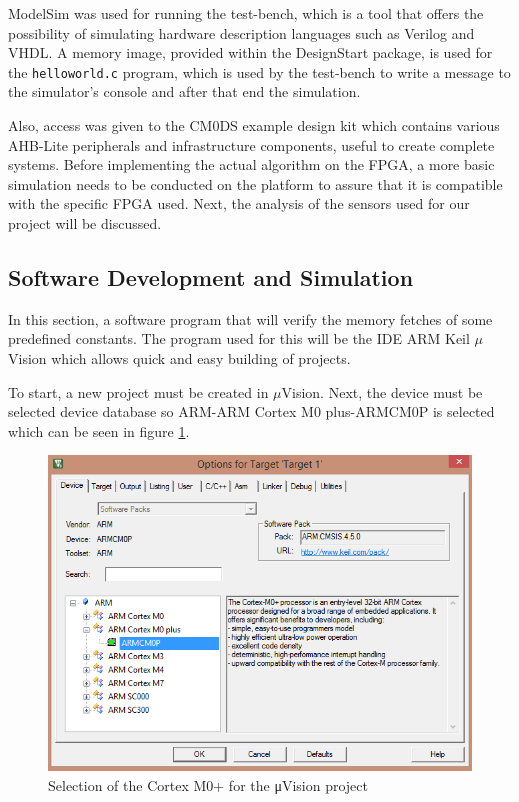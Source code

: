 ModelSim was used for running the test-bench, which is a tool that offers the possibility of simulating hardware description languages such as Verilog and VHDL.  A memory image, provided within the DesignStart package, is used for the \verb|helloworld.c| program, which is used by the test-bench to write a message to the simulator's console and after that end the simulation. 

Also, access was given to the CM0DS example design kit which contains various AHB-Lite peripherals and infrastructure components, useful to create complete systems. Before implementing the actual algorithm on the FPGA, a more basic simulation needs to be conducted on the platform to assure that it is compatible with the specific FPGA used. Next, the analysis of the sensors used for our project will be discussed. 


\subsection{Software Development and Simulation}
In this section, a software program that will verify the memory fetches of some predefined constants. The program used for this will be the IDE ARM Keil $\mu$Vision which allows quick and easy building of projects.

To start, a new project must be created in $\mu$Vision. Next, the device must be selected device database so ARM-ARM Cortex M0 plus-ARMCM0P is selected which can be seen in figure \ref{fig:armcm0p}.

\begin{figure}
\centering
\includegraphics[scale=0.7]{figures/armcm0p.PNG}
\caption{Selection of the Cortex M0+ for the μVision project} 
\label{fig:armcm0p}
\end{figure}

